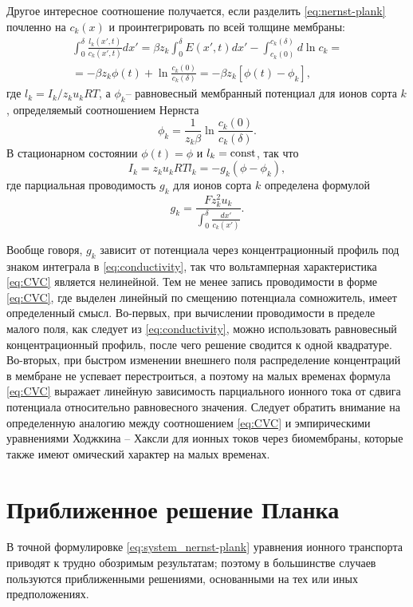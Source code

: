 Другое интересное соотношение получается, если разделить \eqref{eq:nernst-plank}
почленно на \( c_k(x) \) и проинтегрировать по всей толщине мембраны:
\begin{gather*}
    \int_0^\delta \frac{l_k(x', t)}{c_k(x', t)} dx' =
    \beta z_k \int_0^\delta E(x', t) dx' - \int_{c_k(0)}^{c_k(\delta)} d\ln c_k
    =\\= -\beta z_k \phi(t) + \ln\frac{c_k(0)}{c_k(\delta)} =
    -\beta z_k[\phi(t) - \phi_k],
\end{gather*}
где \( l_k = I_k / z_k u_k RT \), а \( \phi_k \)-- равновесный мембранный
потенциал для ионов сорта \( k \), определяемый соотношением Нернста
\[
    \phi_k = \frac{1}{z_k\beta}\ln\frac{c_k(0)}{c_k(\delta)}.
\]
В стационарном состоянии \( \phi(t) = \phi \) и \( l_k = \mathrm{const} \), так что
\begin{equation}
    I_k = z_k u_k RT l_k = -g_k(\phi - \phi_k),
    \label{eq:CVC}
\end{equation}
где парциальная проводимость \( g_k \) для ионов сорта \( k \) определена
формулой
\begin{equation}
    g_k = \frac{F z_k^2 u_k}{\int_0^\delta\frac{dx'}{c_k(x')}}.
    \label{eq:conductivity}
\end{equation}

Вообще говоря, \( g_k \) зависит от потенциала через концентрационный профиль
под знаком интеграла в \eqref{eq:conductivity}, так что вольтамперная
характеристика \eqref{eq:CVC} является нелинейной. Тем не менее запись
проводимости в форме \eqref{eq:CVC}, где выделен линейный по смещению потенциала
сомножитель, имеет определенный смысл. Во-первых, при вычислении проводимости в
пределе малого поля, как следует из \eqref{eq:conductivity}, можно использовать
равновесный концентрационный профиль, после чего решение сводится к одной
квадратуре. Во-вторых, при быстром изменении внешнего поля распределение
концентраций в мембране не успевает перестроиться, а поэтому на малых временах
формула \eqref{eq:CVC} выражает линейную зависимость парциального ионного тока
от сдвига потенциала относительно равновесного значения. Следует обратить
внимание на определенную аналогию между соотношением \eqref{eq:CVC} и
эмпирическими уравнениями Ходжкина -- Хаксли для ионных токов через биомембраны,
которые также имеют омический характер на малых временах.

\section{Приближенное решение Планка}
В точной формулировке \eqref{eq:system_nernst-plank} уравнения ионного
транспорта приводят к трудно обозримым результатам; поэтому в большинстве
случаев пользуются приближенными решениями, основанными на тех или иных
предположениях.

